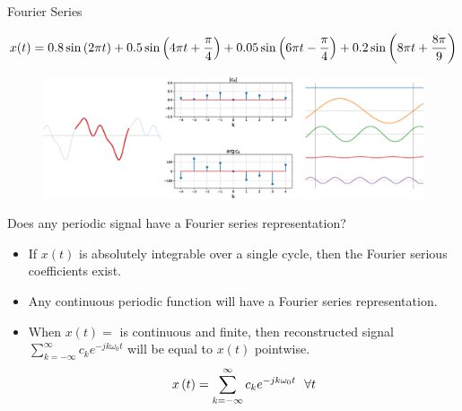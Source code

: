 \documentclass[aspectratio=169]{beamer}
\let\olditem\item
\renewcommand{\item}{\setlength{\itemsep}{\fill}\olditem}
\def\lp{\ensuremath\left(}
\def\rp{\ensuremath\right)}
\begin{document}
\begin{frame}[t]{Fourier Series}
\vspace{-0.5cm}
\begin{small}
\[ x(t) = 0.8 \sin\lp 2\pi t\rp + 0.5 \sin\lp 4\pi t + \frac{\pi}{4}\rp + 0.05 \sin\lp 6\pi t - \frac{\pi}{4}\rp + 0.2 \sin\lp 8\pi t + \frac{8\pi}{9}\rp \]
\end{small}

\begin{figure}
\includegraphics[width=1.0\textwidth]{img/fs-demo-sin.eps}
\end{figure}
\end{frame}


\begin{frame}[t]{Does any periodic signal have a Fourier series representation?}
\begin{itemize}
  \item If $x(t)$ is absolutely integrable over a single cycle, then the Fourier serious coefficients exist.
  \item Any continuous periodic function will have a Fourier series representation.

  \item When $x(t)=$ is continuous and finite, then reconstructed signal $\sum_{k=-\infty}^{\infty} c_k e^{-jk \omega_0 t}$ will be equal to $x(t)$ pointwise.
  \[ x\lp t \rp = \sum_{k=-\infty}^{\infty} c_k e^{-jk \omega_0 t} \,\,\ \forall t \]
\end{itemize}
\end{frame}
\end{document}
